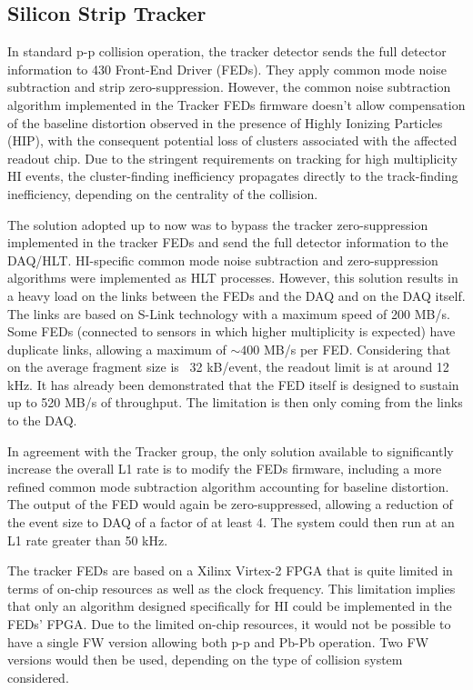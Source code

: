 \subsection{Silicon Strip Tracker\label{subsec:SiTracker}}
In standard p-p collision operation, the tracker detector sends the full detector information to 430 Front-End Driver (FEDs). They apply common mode noise subtraction and strip zero-suppression. However, the common noise subtraction algorithm implemented in the Tracker FEDs firmware doesn't allow compensation of the baseline distortion observed in the presence of Highly Ionizing Particles (HIP), with the consequent potential loss of clusters associated with the affected readout chip. Due to the stringent requirements on tracking for high multiplicity HI events, the cluster-finding inefficiency propagates directly to the track-finding inefficiency, depending on the centrality of the collision.  

The solution adopted up to now was to bypass the tracker zero-suppression implemented in the tracker FEDs and send the full detector information to the DAQ/HLT. HI-specific common mode noise subtraction and zero-suppression algorithms were implemented as HLT processes. However, this solution results in a heavy load on the links between the FEDs and the DAQ and on the DAQ itself. The links are based on S-Link technology with a maximum speed of 200 MB/s. Some FEDs (connected to sensors in which higher multiplicity is expected) have duplicate links, allowing a maximum of $\sim 400$ MB/s per FED.  Considering that on the average fragment size is ~32 kB/event, the readout limit is at around 12 kHz. It has already been demonstrated that the FED itself is designed to sustain up to 520 MB/s of throughput. The limitation is then only coming from the links to the DAQ. 

In agreement with the Tracker group, the only solution available to significantly increase the overall L1 rate is to modify the FEDs firmware, including a more refined common mode subtraction algorithm accounting for baseline distortion. The output of the FED would again be zero-suppressed, allowing a reduction of the event size to DAQ of a factor of at least 4. The system could then run at an L1 rate greater than 50 kHz. 

The tracker FEDs are based on a Xilinx Virtex-2 FPGA that is quite limited in terms of on-chip resources as well as the clock frequency. This limitation implies that only an algorithm designed specifically for HI could be implemented in the FEDs' FPGA. Due to the limited on-chip resources, it would not be possible to have a single FW version allowing both p-p and Pb-Pb operation. Two FW versions would then be used, depending on the type of collision system considered. 

